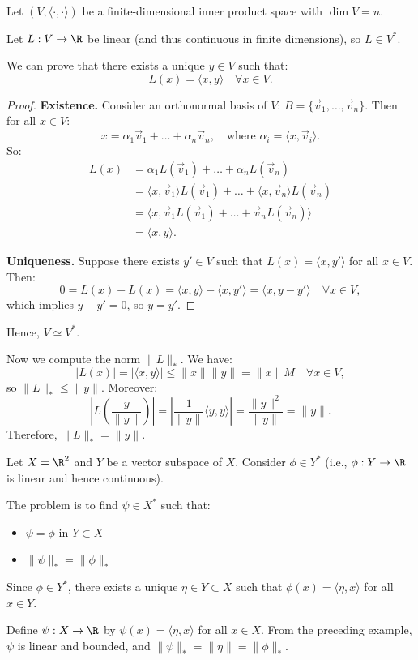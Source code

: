 \begin{example} 

Let $(V, \langle \cdot, \cdot \rangle)$ be a finite-dimensional inner product space with $\dim V = n$.

Let $L : V \to \R$ be linear (and thus continuous in finite dimensions), so $L \in V^*$.

We can prove that there exists a unique $y \in V$ such that:
\[
L(x) = \langle x, y \rangle \quad \forall x \in V.
\]

\begin{proof}
\textbf{Existence.} Consider an orthonormal basis of $V$: $B = \{\vec{v}_1, \dots, \vec{v}_n\}$. Then for all $x \in V$:
\[
x = \alpha_1 \vec{v}_1 + \dots + \alpha_n \vec{v}_n, \quad \text{where } \alpha_i = \langle x, \vec{v}_i \rangle.
\]
So:
\begin{align*}
L(x) &= \alpha_1 L(\vec{v}_1) + \dots + \alpha_n L(\vec{v}_n) \\
&= \langle x, \vec{v}_1 \rangle L(\vec{v}_1) + \dots + \langle x, \vec{v}_n \rangle L(\vec{v}_n) \\
&= \langle x, \vec{v}_1 L(\vec{v}_1) + \dots + \vec{v}_n L(\vec{v}_n) \rangle \\
&= \langle x, y \rangle.
\end{align*}

\textbf{Uniqueness.} Suppose there exists $y' \in V$ such that $L(x) = \langle x, y' \rangle$ for all $x \in V$. Then:
\[
0 = L(x) - L(x) = \langle x, y \rangle - \langle x, y' \rangle = \langle x, y - y' \rangle \quad \forall x \in V,
\]
which implies $y - y' = 0$, so $y = y'$.
\end{proof}

Hence, $V \simeq V^*$.

Now we compute the norm $\|L\|_*$. We have:
\[
|L(x)| = |\langle x, y \rangle| \leq \|x\| \|y\| = \|x\| M \quad \forall x \in V,
\]
so $\|L\|_* \leq \|y\|$. Moreover:
\[
\left| L\left( \frac{y}{\|y\|} \right) \right| = \left| \frac{1}{\|y\|} \langle y, y \rangle \right| = \frac{\|y\|^2}{\|y\|} = \|y\|.
\]
Therefore, $\|L\|_* = \|y\|$.

\end{example}

\begin{example} [Extension in $\R^2$]

Let $X = \R^2$ and $Y$ be a vector subspace of $X$. Consider $\phi \in Y^*$ (i.e., $\phi : Y \to \R$ is linear and hence continuous).

The problem is to find $\psi \in X^*$ such that:
\begin{itemize}
\item $\psi = \phi$ in $Y \subset X$
\item $\|\psi\|_* = \|\phi\|_*$
\end{itemize}

Since $\phi \in Y^*$, there exists a unique $\eta \in Y \subset X$ such that $\phi(x) = \langle \eta, x \rangle$ for all $x \in Y$.

Define $\psi : X \to \R$ by $\psi(x) = \langle \eta, x \rangle$ for all $x \in X$. From the preceding example, $\psi$ is linear and bounded, and $\|\psi\|_* = \|\eta\| = \|\phi\|_*$.
\end{example}

